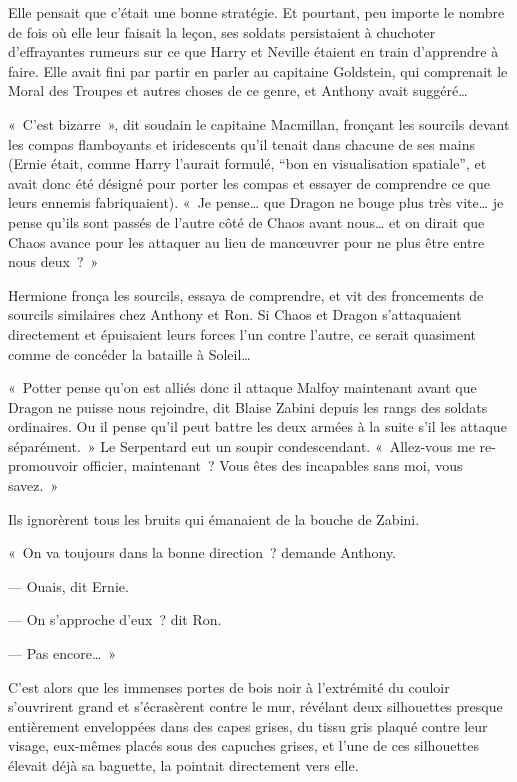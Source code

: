 Elle pensait que c'était une bonne stratégie.
Et pourtant, peu importe le nombre de fois où elle leur faisait la leçon, ses soldats persistaient à chuchoter d'effrayantes rumeurs sur ce que Harry et Neville étaient en train d'apprendre à faire.
Elle avait fini par partir en parler au capitaine Goldstein, qui comprenait le Moral des Troupes et autres choses de ce genre, et Anthony avait suggéré…

«~C'est bizarre~», dit soudain le capitaine Macmillan, fronçant les sourcils devant les compas flamboyants et iridescents qu'il tenait dans chacune de ses mains (Ernie était, comme Harry l'aurait formulé, “bon en visualisation spatiale”, et avait donc été désigné pour porter les compas et essayer de comprendre ce que leurs ennemis fabriquaient).
«~Je pense… que Dragon ne bouge plus très vite… je pense qu'ils sont passés de l'autre côté de Chaos avant nous… et on dirait que Chaos avance pour les attaquer au lieu de manœuvrer pour ne plus être entre nous deux~?~»

Hermione fronça les sourcils, essaya de comprendre, et vit des froncements de sourcils similaires chez Anthony et Ron.
Si Chaos et Dragon s'attaquaient directement et épuisaient leurs forces l'un contre l'autre, ce serait quasiment comme de concéder la bataille à Soleil…

«~Potter pense qu'on est alliés donc il attaque Malfoy maintenant avant que Dragon ne puisse nous rejoindre, dit Blaise Zabini depuis les rangs des soldats ordinaires.
Ou il pense qu'il peut battre les deux armées à la suite s'il les attaque séparément.~»
Le Serpentard eut un soupir condescendant.
«~Allez-vous me re-promouvoir officier, maintenant~?
Vous êtes des incapables sans moi, vous savez.~»

Ils ignorèrent tous les bruits qui émanaient de la bouche de Zabini.

«~On va toujours dans la bonne direction~? demande Anthony.

--- Ouais, dit Ernie.

--- On s'approche d'eux~? dit Ron.

--- Pas encore…~»

C'est alors que les immenses portes de bois noir à l'extrémité du couloir s'ouvrirent grand et s'écrasèrent contre le mur, révélant deux silhouettes presque entièrement enveloppées dans des capes grises, du tissu gris plaqué contre leur visage, eux-mêmes placés sous des capuches grises, et l'une de ces silhouettes élevait déjà sa baguette, la pointait directement vers elle.

